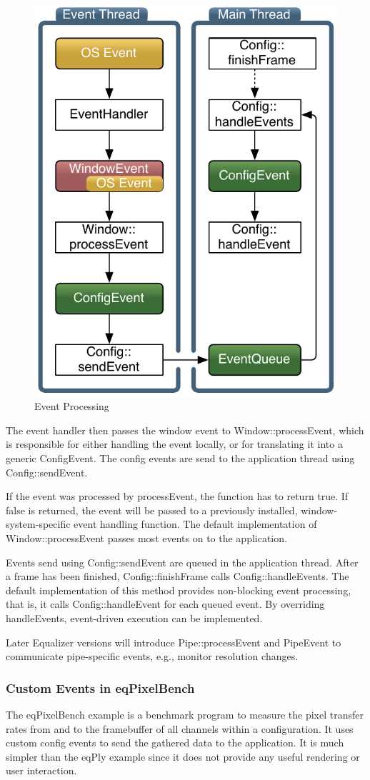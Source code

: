 \documentclass[10pt,a4]{scrartcl}
\begin{document}
\begin{figure}
  \includegraphics[width=.382\textwidth]{images/eventFilter.pdf}
  {\caption{\small\label{fEventProcessing}Event Processing}}
\end{figure}
The event handler then passes the window event to
\textsf{Window::processEvent}, which is responsible for either handling
the event locally, or for translating it into a generic
\textsf{ConfigEvent}. The config events are send to the application
thread using \textsf{Config::sendEvent}. 

If the event was processed by \textsf{processEvent}, the function has to
return \textsf{true}. If \textsf{false} is returned, the event will be
passed to a previously installed, window-system-specific event handling
function. The default implementation of \textsf{Window::pro\-cess\-Event}
passes most events on to the application.

Events send using \textsf{Config::sendEvent} are queued in the
application thread. After a frame has been finished,
\textsf{Config::finishFrame} calls \textsf{Config::handleEvents}. The
default implementation of this method provides non-blocking event
processing, that is, it calls \textsf{Config::handleEvent} for each
queued event. By overriding \textsf{handleEvents}, event-driven
execution can be implemented.

Later Equalizer versions will introduce \textsf{Pipe::pro\-cess\-Event} and
\textsf{PipeEvent} to communicate pipe-specific events, e.g., monitor
resolution changes.

\subsubsection{Custom Events in eqPixelBench}

The \textsf{eqPixelBench} example is a benchmark program to measure the
pixel transfer rates from and to the framebuffer of all channels within
a configuration. It uses custom config events to send the gathered data
to the application. It is much simpler than the \textsf{eqPly} example
since it does not provide any useful rendering or user interaction.
\end{document}
